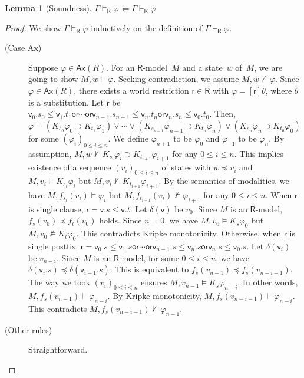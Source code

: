 \documentclass[doctor]{iscs-thesis}
\newcommand{\vdashR}{\vdash_{\mathsf R}}
\newcommand{\modelsR}{\models_{\mathsf R}}
\newtheorem{lemma}{Lemma}
\newcommand{\wor}{\mathsf{{or}}}
\begin{document}
\begin{lemma}[Soundness]
 $\Gamma\modelsR\varphi\Longleftarrow\Gamma\vdashR\varphi$
\end{lemma}
\begin{proof}
We show $\Gamma\modelsR\varphi$ inductively
on the definition of $\Gamma\vdashR\varphi$.
\begin{description}
 \item[(Case {Ax})]
	    Suppose $\varphi\in \mathsf{Ax}(R)$.
	    For an $\mathsf{R}$-model~$M$ and a state~$w$ of~$M$,
	    we are going to show $M,w\models\varphi$.
	    Seeking contradiction,
	    we assume $M,w\not\models\varphi$.
	    Since $\varphi\in\mathsf{Ax}(R)$, there exists a world
	    restriction $\mathsf r\in\mathsf R$ with
	    $\varphi=[\mathsf r]\theta$,
	    where $\theta$ is a substitution.
	    Let $\mathsf r$ be
	    $\mathsf v_0.s_0\le\mathsf v_1.t_1\wor\cdots\wor
	    \mathsf v_{n-1}.s_{n-1}\le\mathsf v_n.t_n\wor\mathsf
	    v_n.s_n\le\mathsf v_0.t_0$.
	    Then,
	    $\varphi = (K_{s_0}\varphi_0\supset
	    K_{t_1}\varphi_1)\vee\cdots\vee
	    (K_{s_{n-1}}\varphi_{n-1}\supset K_{t_n}\varphi_n)
	    \vee (K_{s_n}\varphi_n\supset K_{t_0}\varphi_0)$
	    for some $(\varphi_i)_{0\le i\le n}$.
	    We define $\varphi_{n+1}$ to be $\varphi_0$ and
	    $\varphi_{-1}$ to be $\varphi_n$.
	    By assumption, $M,w\not\models K_{s_i}\varphi_i\supset
	    K_{t_{i+1}}\varphi_{i+1}$ for any $0\le i\le n$.
	    This implies existence of a sequence
	    $(v_i)_{0\le i\le n}$ of states with $w\preceq v_i$ and
	    $M,v_i\models K_{s_i}\varphi_i$ but $M,v_i\not\models
	    K_{t_{i+1}}\varphi_{i+1}$.
	    By the semantics of modalities, we have
	    $M,f_{s_i}(v_i)\models \varphi_i$ but $M,
	    f_{t_{i+1}}(v_i)\not\models\varphi_{i+1}$
	    for any $0\le i\le n$.
	    When $\mathsf r$ is single clause,
	    $\mathsf r = \mathsf v.s\le\mathsf v.t$.
	    Let $\delta(\mathsf v)$ be $v_0$.
	    Since $M$ is an $\mathsf R$-model,
	    $f_s(v_0)\preceq f_t(v_0)$ holds.
	    Since $n=0$,
	    we have $M,v_0\models K_s\varphi_0$ but $M,v_0\not\models
	    K_t\varphi_0$.
	    This contradicts Kripke monotonicity.
	    Otherwise, when $\mathsf r$ is single postfix,
	    $\mathsf r = \mathsf v_0.s\le\mathsf
	    v_1.s\wor\cdots\wor\mathsf v_{n-1}.s\le\mathsf
	    v_n.s\wor\mathsf v_n.s\le\mathsf v_0.s$.
	    Let $\delta(\mathsf v_i)$ be $v_{n-i}$.
	    Since $M$ is an $\mathsf R$-model,
	    for some $0\le i\le n$,
	    we have $\delta(\mathsf v_i.s)\preceq \delta(\mathsf
	    v_{i+1}.s)$.
	    This is equivalent to $f_s(v_{n-1})\preceq f_s(v_{n-i-1})$.
	    The way we took $(v_i)_{0\le i\le n}$ ensures
	    $M,v_{n-1}\models K_s\varphi_{n-i}$.
	    In other words, $M,f_s(v_{n-1})\models \varphi_{n-i}$.
	    By Kripke monotonicity, $M,f_s(v_{n-i-1})\models
	    \varphi_{n-i}$.
	    This contradicts $M,f_s(v_{n-i-1})\not\models\varphi_{n-1}$.
 \item[(Other rules)]
	    Straightforward.
\end{description}
\end{proof}
\end{document}
